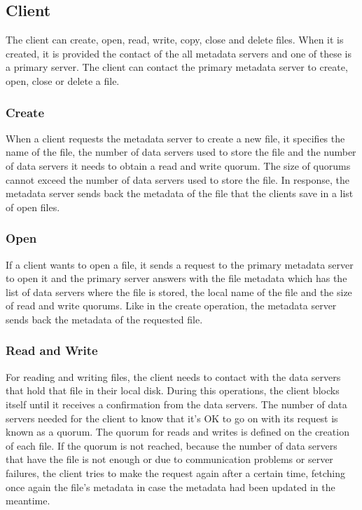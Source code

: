 \subsection{Client}

The client can create, open, read, write, copy, close and delete files. When
it is created, it is provided the contact of the all metadata servers
and one of these is a primary server. 
The client can contact the primary metadata server to create, open,
close or delete a file.

\subsubsection{Create} 

When a client requests the metadata server to create a new file, it
specifies the name of the file, the number of data servers used to
store the file and the number of data servers it needs to obtain a read
and write quorum. The size of quorums cannot exceed the number of data
servers used to store the file. In response, the metadata server sends back the
metadata of the file that the clients save in a list of open files.

\subsubsection{Open}

If a client wants to open a file, it sends a request to the primary
metadata server to open it and the primary server answers with the file
metadata which has the list of data servers where the file is stored, the local name
of the file and the size of read and write quorums. Like in the create operation, the
metadata server sends back the metadata of the requested file.

\subsubsection{Read and Write}

For reading and writing files, the client needs to contact with the data servers
that hold that file in their local disk. During this operations, the client blocks
itself until it receives a confirmation from the data servers. The number of data
servers needed for the client to know that it's OK to go on with its request is known
as a quorum. The quorum for reads and writes is defined on the creation of each file.
If the quorum is not reached, because the number of data servers that have the file
is not enough or due to communication problems or server failures, the client tries
to make the request again after a certain time, fetching once again the file's metadata
in case the metadata had been updated in the meantime.

